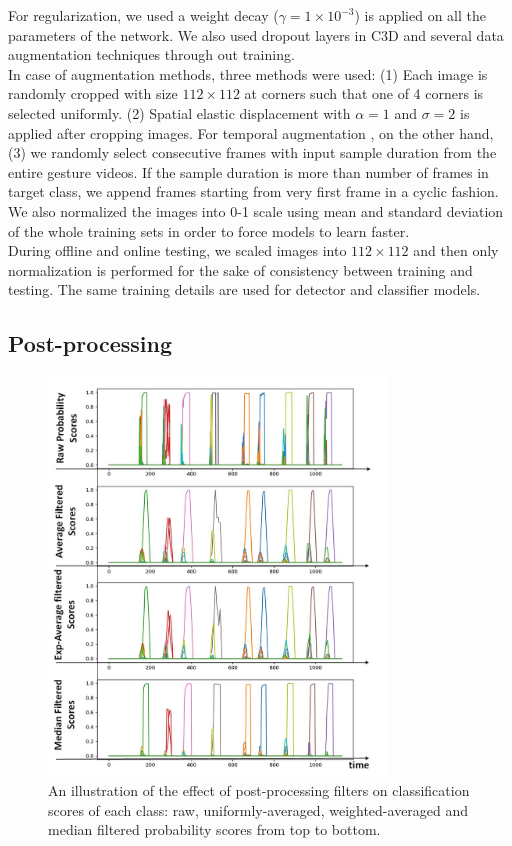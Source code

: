 For regularization, we used a weight decay ($\gamma = 1 \times 10^{-3}$) is applied on all the parameters of the network. We also used dropout layers in C3D and several data augmentation techniques through out training.\\

In case of augmentation methods, three methods were used: (1) Each image is randomly cropped with size $112 \times 112$ at corners such that one of 4 corners is selected uniformly. (2) Spatial elastic displacement with $\alpha = 1$ and $\sigma = 2$ is applied after cropping images. For temporal augmentation , on the other hand, (3) we randomly select consecutive frames with input sample duration from the entire gesture videos. If the sample duration is more than number of frames in target class, we append frames starting from very first frame in a cyclic fashion. We also normalized the images into 0-1 scale using mean and standard deviation of the whole training sets in order to force models to learn faster.\\

During offline and online testing, we scaled images into $112 \times 112$ and then only normalization is performed for the sake of consistency between training and testing. The same training details are used for detector and classifier models.\\
\clearpage
\subsection{Post-processing}
\label{subsec:pp}
\begin{figure}[b!]
	\centering
	\includegraphics[width=0.8\textwidth]{figures/post}
	\caption{An illustration of the effect of post-processing filters on classification scores of each class: raw, uniformly-averaged, weighted-averaged and median filtered probability scores from top to bottom.}
	\label{fig:post}
\end{figure}


